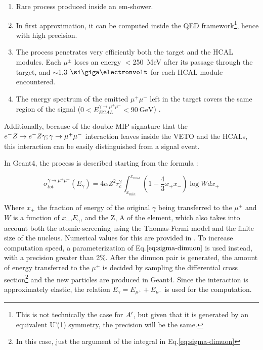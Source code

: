 \begin{enumerate}
\item Rare process produced inside an em-shower.
\item In first approximation, it can be computed inside the QED framework\footnote{This is not technically the case for $A'$, but given that it is generated by an equivalent U'(1) symmetry, the precision will be the same.}, hence with high precision.
\item The process penetrates very efficiently both the target and the HCAL modules. Each $\mu^{\pm}$ loses an energy $<$\SI{250}{\mega\electronvolt} after its passage through the target, and $\sim$1.3 $\gev$ for each HCAL module encountered. 
\item The energy spectrum of the emitted $\mu^+\mu^-$ left in the target covers the same region of the signal ($0 < E_{ECAL}^{\gamma \to \mu^+ \mu^-} < \SI{90}{\giga\electronvolt}$) \cite{dimuon-mc}.
\end{enumerate}

Additionally, because of the double MIP signature that the $e^- Z \to e^- Z \gamma; \gamma \to \mu^+ \mu^-$ interaction leaves inside the VETO and the HCALs, this interaction can be easily distinguished from a signal event.

In Geant4, the process is described starting from the formula \cite{dimuon-mc}:

\begin{equation}
  \label{eq:sigma-dimuon}
  \sigma_{tot}^{\gamma \to \mu^+ \mu^-}(E_{\gamma}) = 4\alpha Z^2 r^2_c\int^{x_{max}}_{x_{min}} \left(1 - \frac{4}{3}x_+x_- \right) \log{W}dx_+
\end{equation}

Where $x_+$ the fraction of energy of the original $\gamma$ being transferred to the $\mu^+$ and $W$ is a function of $x_+$,$E_{\gamma}$, and the Z, A of the element, which also takes into account both the atomic-screening using the Thomas-Fermi model and the finite size of the nucleus. Numerical values for this are provided in \cite{dimuon-mc}. To increase computation speed, a parameterization of Eq.$\ref{eq:sigma-dimuon}$ is used instead, with a precision greater than 2\%. After the dimuon pair is generated, the amount of energy transferred to the $\mu^+$ is decided by sampling the differential cross section\footnote{In this case, just the argument of the integral in Eq.\ref{eq:sigma-dimuon}} and the new particles are produced in Geant4. Since the interaction is approximately elastic, the relation $E_{\gamma} = E_{\mu^+} + E_{\mu^-}$ is used for the computation.

